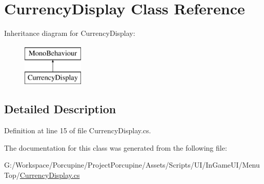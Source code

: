 \hypertarget{class_currency_display}{}\section{Currency\+Display Class Reference}
\label{class_currency_display}
Inheritance diagram for Currency\+Display\+:\begin{figure}[H]
\begin{center}
\leavevmode
\includegraphics[height=2.000000cm]{class_currency_display}
\end{center}
\end{figure}


\subsection{Detailed Description}


Definition at line 15 of file Currency\+Display.\+cs.



The documentation for this class was generated from the following file\+:\begin{DoxyCompactItemize}
\item 
G\+:/\+Workspace/\+Porcupine/\+Project\+Porcupine/\+Assets/\+Scripts/\+U\+I/\+In\+Game\+U\+I/\+Menu\+Top/\hyperlink{_currency_display_8cs}{Currency\+Display.\+cs}\end{DoxyCompactItemize}
